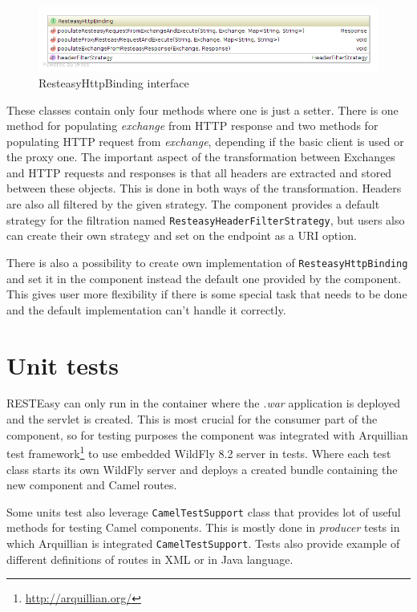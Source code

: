 \documentclass[12pt,final,oneside]{fithesis2}
\begin{document}
\begin{figure}[!h]
\centering
\includegraphics[width=1.0\linewidth]{images/binding.png}
\caption{ResteasyHttpBinding interface}
\label{comp}
\end{figure}


These classes contain only four methods where one is just a setter. There is one method for populating \textit{exchange} from HTTP response and two methods for populating HTTP request from \textit{exchange}, depending if the basic client is used or the proxy one. The important aspect of the transformation between Exchanges and HTTP requests and responses is that all headers are extracted and stored between these objects. This is done in both ways of the transformation. Headers are also all filtered by the given strategy. The component provides a default strategy for the filtration named \texttt{ResteasyHeaderFilterStrategy}, but users also can create their own strategy and set on the endpoint as a URI option.

There is also a possibility to create own implementation of \texttt{Resteasy\-HttpBinding} and set it in the component instead the default one provided by the component. This gives user more flexibility if there is some special task that needs to be done and the default implementation can't handle it correctly.  


\section{Unit tests}
RESTEasy can only run in the container where the \textit{.war} application is deployed and the servlet is created. This is most crucial for the consumer part of the component, so for testing purposes the component was integrated with Arquillian test framework\footnote{\url{http://arquillian.org/}} to use embedded WildFly 8.2 server in tests. Where each test class starts its own WildFly server and deploys a created bundle containing the new component and Camel routes.  

Some units test also leverage \texttt{CamelTestSupport} class that provides lot of useful methods for testing Camel components. This is mostly done in \textit{producer} tests in which Arquillian is integrated \texttt{CamelTestSupport}. Tests also provide example of different definitions of routes in XML or in Java language.
\end{document}
